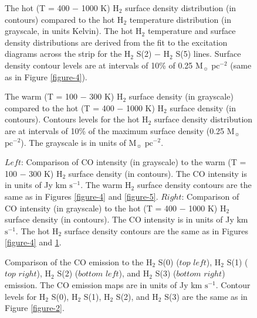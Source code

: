 \documentclass[12pt,preprint]{aastex}
\begin{document}
\clearpage
\begin{figure}
\caption{The hot (T = 400 $-$ 1000 K) H$_2$ surface density distribution (in contours) 
compared to the hot H$_2$ temperature distribution (in grayscale, in units Kelvin).  
The hot H$_2$ temperature and surface density distributions are derived from the 
fit to the excitation diagrams across the strip for the H$_2$ S(2) $-$ H$_2$ S(5) lines.  Surface density 
contour levels are at intervals of 10\% of 0.25 $\mathrm{M_\sun}$ $\mathrm{pc^{-2}}$ (same as in Figure \ref{figure-4}).}
\label{figure-6}
\end{figure}

\clearpage

\begin{figure}
\caption{The warm (T = 100 $-$ 300 K) H$_2$ surface density (in grayscale) compared to
 the hot (T = 400 $-$ 1000 K) H$_2$ surface density (in contours).  Contours levels for the 
 hot H$_2$ surface density distribution are at intervals of 10\% of the maximum surface density 
 (0.25 $\mathrm{M_\sun}$ $\mathrm{pc^{-2}}$).  The grayscale is in units of 
 $\mathrm{M_\sun}$ $\mathrm{pc^{-2}}$.}
\label{figure-7}
\end{figure}

\clearpage

\begin{figure}
\caption{$Left$: Comparison of  CO intensity (in grayscale) to the warm (T = 100 $-$ 300 K) 
H$_2$ surface density (in contours).  The CO intensity is in units of Jy km $\mathrm{s^{-1}}$. 
The warm H$_2$ surface density contours are the same as in Figures \ref{figure-4} and \ref{figure-5}.  
$Right$: Comparison of CO intensity (in grayscale) to the hot (T = 400 $-$ 1000 K) 
H$_2$ surface density (in contours).  The CO intensity is in units of Jy km 
$\mathrm{s^{-1}}$. The hot H$_2$ surface density contours are the same as in 
Figures \ref{figure-4} and \ref{figure-6}.}
\label{figure-8}
\end{figure}

\clearpage

\begin{figure}
\caption{Comparison of the CO emission to the H$_2$ S(0) ($top$ $left$), 
 H$_2$ S(1) ($top$ $right$),  H$_2$ S(2) ($bottom$ $left$),  and 
 H$_2$ S(3) ($bottom$ $right$) emission.  The CO emission maps are in 
 units of Jy km $\mathrm{s^{-1}}$.  Contour levels for H$_2$ S(0), 
 H$_2$ S(1), H$_2$ S(2), and H$_2$ S(3) are the 
 same as in Figure \ref{figure-2}.}
\label{figure-9}
\end{figure}
\end{document}
